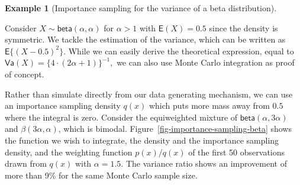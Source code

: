 \documentclass[
  11pt,
  letterpaper,
]{scrbook}
\theoremstyle{definition}
\theoremstyle{definition}
\newtheorem{example}{Example}[chapter]
\theoremstyle{definition}
\theoremstyle{plain}
\theoremstyle{plain}
\theoremstyle{plain}
\theoremstyle{remark}
\begin{document}
\begin{example}[Importance sampling for the variance of a beta
distribution]\protect\hypertarget{exm-is-beta-variance}{}\label{exm-is-beta-variance}

Consider \(X \sim \mathsf{beta}(\alpha, \alpha)\) for \(\alpha > 1\)
with \(\mathsf{E}(X)=0.5\) since the density is symmetric. We tackle the
estimation of the variance, which can be written as
\(\mathsf{E}\{(X - 0.5)^2\}.\) While we can easily derive the
theoretical expression, equal to
\(\mathsf{Va}(X) = \{4 \cdot (2\alpha+1)\}^{-1},\) we can also use Monte
Carlo integration as proof of concept.

Rather than simulate directly from our data generating mechanism, we can
use an importance sampling density \(q(x)\) which puts more mass away
from \(0.5\) where the integral is zero. Consider the equiweighted
mixture of \(\mathsf{beta}(\alpha, 3\alpha)\) and
\(\mathsf{\beta}(3\alpha, \alpha)\), which is bimodal.
Figure~\ref{fig-importance-sampling-beta} shows the function we wish to
integrate, the density and the importance sampling density, and the
weighting function \(p(x)/q(x)\) of the first 50 observations drawn from
\(q(x)\) with \(\alpha=1.5.\) The variance ratio shows an improvement of
more than 9\% for the same Monte Carlo sample size.


\end{example}
\end{document}
